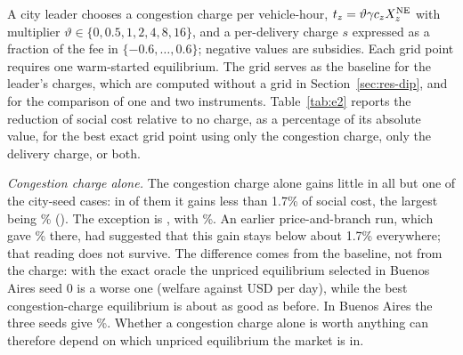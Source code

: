 \documentclass[preprint,12pt]{elsarticle}
\theoremstyle{definition}
\theoremstyle{remark}
\begin{document}
A city leader chooses a congestion charge per vehicle-hour, $t_z=\vartheta\gamma c_zX_z^{\rm NE}$ with multiplier $\vartheta\in\{0,0.5,1,2,4,8,16\}$, and a per-delivery charge $s$ expressed as a fraction of the fee in $\{-0.6,\dots,0.6\}$; negative values are subsidies. Each grid point requires one warm-started equilibrium. The grid serves as the baseline for the leader's charges, which are computed without a grid in Section~\ref{sec:res-dip}, and for the comparison of one and two instruments. Table~\ref{tab:e2} reports the reduction of social cost relative to no charge, as a percentage of its absolute value, for the best exact grid point using only the congestion charge, only the delivery charge, or both.

\begin{table}[t]\centering\small
\caption{City leader, main objective, exact oracle (\EtwoSeeds). Gain of the best charge over no charge (\% of $|$social cost$|$), mean [min, max] over seeds, with the congestion charge only, the delivery charge only, or both. Delivery share: gain with the delivery charge alone divided by the gain with both, per seed, shown where the combined gain is at least 0.5\%. Subsidy: seeds in which the best point with both instruments has $s<0$. Served share and city revenue (USD/day; negative is a net subsidy) at that point. $\dagger$: only a subset of the grid solved exactly, so gains are lower bounds and shares are ratios of lower bounds (a share above one is an artefact of the reduced grid).}\label{tab:e2}
\end{table}

\emph{Congestion charge alone.} The congestion charge alone gains little in all but one of the \NCases{} city-seed cases: in \EtwoCongBelowN{} of them it gains less than 1.7\% of social cost, the largest being \EtwoCongSecond\% (\EtwoCongSecondCase). The exception is \EtwoCongMaxCase, with \EtwoCongMax\%. An earlier price-and-branch run, which gave \ExBACongOld\% there, had suggested that this gain stays below about 1.7\% everywhere; that reading does not survive. The difference comes from the baseline, not from the charge: with the exact oracle the unpriced equilibrium selected in Buenos Aires seed 0 is a worse one (welfare \ExBAWNew{} against \ExBAWOld{} USD per day), while the best congestion-charge equilibrium is about as good as before. In Buenos Aires the three seeds give \EtwoCongBA\%. Whether a congestion charge alone is worth anything can therefore depend on which unpriced equilibrium the market is in.
\end{document}
